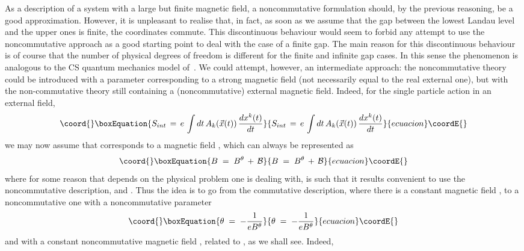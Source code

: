 \documentclass[a4paper,12pt]{article}
\begin{document}
As a description of a system with a large but finite magnetic
field, a
noncommutative formulation should, by the previous reasoning, be a
good approximation. However, it is unpleasant to realise that, in
fact, as soon as we assume that the gap between the lowest Landau
level and the upper ones is finite, the coordinates commute. This
discontinuous behaviour would seem to forbid any attempt to use the
noncommutative approach as a good starting point to deal with the
case
of a finite gap. The main reason for this discontinuous behaviour
is
of course that the number of physical degrees of freedom is
different
for the finite and infinite gap cases. In this sense the phenomenon
is
analogous to the CS quantum mechanics model of~\cite{jackiw}.  We
could attempt, however, an intermediate approach: the
noncommutative
theory could be introduced with a \myHighlight{$\theta$}\coordHE{} parameter corresponding
to a
strong magnetic field (not necessarily equal to the real external
one), but with the non-commutative theory still containing a
(noncommutative) external magnetic field. Indeed, for the single
particle action in an external field,
\begin{equation}\coord{}\boxEquation{
  \label{eq:sintg}
S_{int} \,=\, e\, \int dt \,A_k({\vec x}(t))\, \frac{dx^k(t)}{dt} 
}{
  S_{int} \,=\, e\, \int dt \,A_k({\vec x}(t))\, \frac{dx^k(t)}{dt} 
}{ecuacion}\coordE{}\end{equation}
we may now assume that \coordHE{} corresponds to a magnetic field \coordHE{},
which can always be represented as
\begin{equation}\coord{}\boxEquation{
  \label{eq:decomp}
B \;=\; B^\theta \,+\, {\mathcal B} 
}{
  B \;=\; B^\theta \,+\, {\mathcal B} 
}{ecuacion}\coordE{}\end{equation}
where for some reason that depends on the physical problem one is
dealing with, \coordHE{} is such that it results convenient to use
the
noncommutative description, and \coordHE{}. Thus
the
idea is to go from the commutative description, where there is a
constant magnetic field \coordHE{}, to a noncommutative one with a
noncommutative parameter
\begin{equation}\coord{}\boxEquation{
  \label{eq:deftheta}
\theta \;=\; - \frac{1}{e B^\theta}
}{
  \theta \;=\; - \frac{1}{e B^\theta}
}{ecuacion}\coordE{}\end{equation}
and with a constant noncommutative magnetic field \coordHE{}, related to \coordHE{}, as we shall see.  Indeed,
\end{document}
